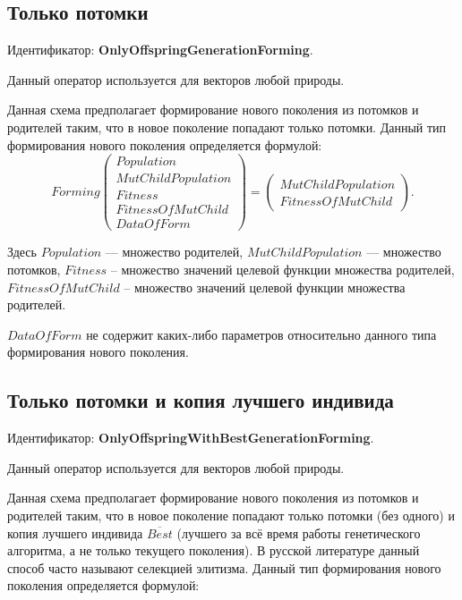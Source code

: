 \documentclass[a4paper,12pt]{article}
\begin{document}
\subsection{Только потомки}\label{SetOfOperatorsAlgorithms:OnlyOffspringGenerationForming}

Идентификатор: \textbf{OnlyOffspringGenerationForming}.

Данный оператор используется для векторов любой природы.

Данная схема предполагает формирование нового поколения из потомков и родителей таким, что в новое поколение попадают только потомки. Данный тип формирования нового поколения определяется формулой:
\begin{equation}
\label{SetOfOperatorsAlgorithms:eq:OnlyOffspringGenerationForming}
Forming \left( \begin{array}{c} Population\\MutChildPopulation\\Fitness\\FitnessOfMutChild\\DataOfForm\end{array}\right) =\left( \begin{array}{c} MutChildPopulation\\FitnessOfMutChild\end{array}\right).
\end{equation}

Здесь $ Population $ --- множество родителей, $MutChildPopulation$ --- множество потомков, $ Fitness $ -- множество значений целевой функции множества родителей, $ FitnessOfMutChild $ -- множество значений целевой функции множества родителей. 

$ DataOfForm $ не содержит каких-либо параметров относительно данного типа формирования нового поколения.


\subsection{Только потомки и копия лучшего индивида}\label{SetOfOperatorsAlgorithms:OnlyOffspringWithBestGenerationForming}

Идентификатор: \textbf{OnlyOffspringWithBestGenerationForming}.

Данный оператор используется для векторов любой природы.

Данная схема предполагает формирование нового поколения из потомков и родителей таким, что в новое поколение попадают только потомки (без одного) и копия лучшего индивида $ \overline{Best} $ (лучшего за всё время работы генетического алгоритма, а не только текущего поколения). В русской литературе данный способ часто называют селекцией элитизма. Данный тип формирования нового поколения определяется формулой:
\end{document}
